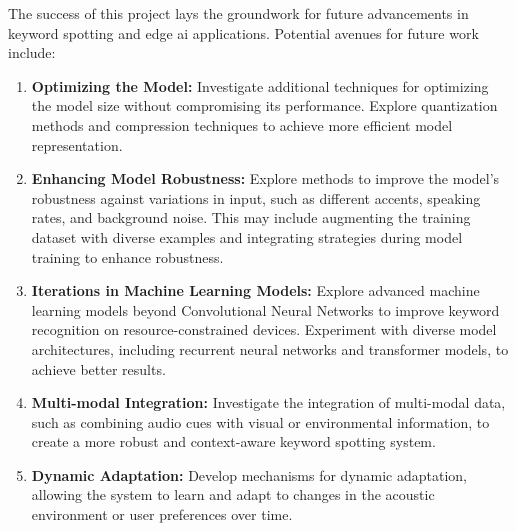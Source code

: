 The success of this project lays the groundwork for future advancements in keyword spotting and edge \ac{ai} applications. Potential avenues for future work include:

\begin{enumerate}
	
	\item \textbf{Optimizing the Model:} Investigate additional techniques for optimizing the model size without compromising its performance. Explore quantization methods and compression techniques to achieve more efficient model representation.
	
	\item \textbf{Enhancing Model Robustness:} Explore methods to improve the model's robustness against variations in input, such as different accents, speaking rates, and background noise. This may include augmenting the training dataset with diverse examples and integrating strategies during model training to enhance robustness.
	
	\item \textbf{Iterations in Machine Learning Models:} Explore advanced machine learning models beyond Convolutional Neural Networks to improve keyword recognition on resource-constrained devices. Experiment with diverse model architectures, including recurrent neural networks and transformer models, to achieve better results.
	
	\item \textbf{Multi-modal Integration:} Investigate the integration of multi-modal data, such as combining audio cues with visual or environmental information, to create a more robust and context-aware keyword spotting system.
	
	\item \textbf{Dynamic Adaptation:} Develop mechanisms for dynamic adaptation, allowing the system to learn and adapt to changes in the acoustic environment or user preferences over time.

\end{enumerate}

